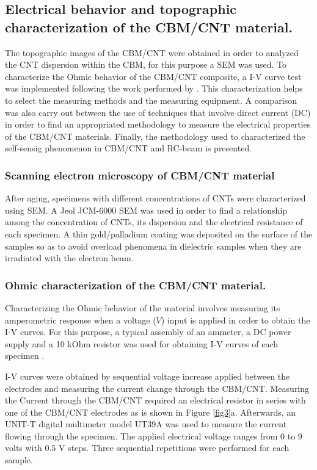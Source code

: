 \documentclass[twocolumn]{bmcart}%
\begin{document}
\subsection{Electrical behavior and topographic characterization of the CBM/CNT material.}


The topographic images of the CBM/CNT were obtained in order to analyzed the CNT dispersion within the CBM, for this purpose a SEM was used. To characterize the Ohmic behavior of the CBM/CNT composite, a I-V curve test  was implemented following the work performed by \citet{Han2015a}. This characterization helps to select the measuring methods and the measuring equipment. A comparison was also carry out between the use of techniques that involve direct current (DC) in order to find an appropriated methodology to measure the electrical properties of the CBM/CNT materials. Finally, the methodology used to characterized the self-sensig phenomenon in CBM/CNT and RC-beam is presented.

\subsubsection{Scanning electron microscopy of CBM/CNT material}\label{SEM}
After aging, specimens with different concentrations of CNTs were characterized using SEM. A Jeol JCM-6000 SEM was used in order to find a relationship among the concentration of CNTs, its dispersion and the electrical resistance of each specimen. A thin gold/palladium coating was deposited on the surface of the samples so as to avoid overload phenomena in dielectric samples when they are irradiated with the electron beam.

\subsubsection{Ohmic characterization of the CBM/CNT material.}\label{Ohm}

Characterizing the Ohmic behavior of the material involves measuring its  amperometric response when a voltage ($V$) input is applied in order to obtain the I-V curves. For this purpose, a typical assembly  of an ammeter, a DC power supply and a 10 kOhm resistor was used for obtaining I-V curves of each specimen \cite{YORKE1981200}.


I-V curves were obtained by sequential voltage increase applied between the electrodes and measuring the current change through the CBM/CNT. Measuring the Current through the CBM/CNT required an electrical resistor in series with one of the CBM/CNT electrodes as is shown in Figure \ref{fig3}a. Afterwards, an UNIT-T digital multimeter model UT39A was used to measure the current flowing through the specimen. The applied electrical voltage ranges from 0 to 9 volts with 0.5 V steps. Three sequential repetitions were performed for each sample.
\end{document}
